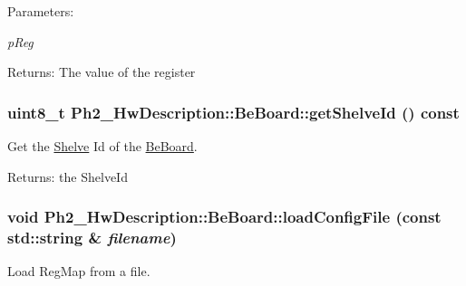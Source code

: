 \begin{Desc}
\item[Parameters:]
\begin{description}
\item[{\em p\-Reg}]\end{description}
\end{Desc}
\begin{Desc}
\item[Returns:]The value of the register \end{Desc}
\hypertarget{class_ph2___hw_description_1_1_be_board_28b9dd9cdcc4fc22f03d36432de37ddf}{
\subsubsection[getShelveId]{\setlength{\rightskip}{0pt plus 5cm}uint8\_\-t Ph2\_\-Hw\-Description::Be\-Board::get\-Shelve\-Id () const}}
\label{class_ph2___hw_description_1_1_be_board_28b9dd9cdcc4fc22f03d36432de37ddf}


Get the \hyperlink{class_ph2___hw_description_1_1_shelve}{Shelve} Id of the \hyperlink{class_ph2___hw_description_1_1_be_board}{Be\-Board}. 

\begin{Desc}
\item[Returns:]the Shelve\-Id \end{Desc}
\hypertarget{class_ph2___hw_description_1_1_be_board_ec21c67ac5b5219cfb13ec13e4905402}{
\subsubsection[loadConfigFile]{\setlength{\rightskip}{0pt plus 5cm}void Ph2\_\-Hw\-Description::Be\-Board::load\-Config\-File (const std::string \& {\em filename})}}
\label{class_ph2___hw_description_1_1_be_board_ec21c67ac5b5219cfb13ec13e4905402}


Load Reg\-Map from a file. 

